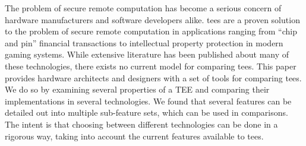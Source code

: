 The problem of secure remote computation has become a serious concern of hardware manufacturers and software developers alike. \glspl{tee} are a proven solution to the problem of secure remote computation in applications ranging from ``chip and pin'' financial transactions to intellectual property protection in modern gaming systems. While extensive literature has been published about many of these technologies, there exists no current model for comparing \glspl{tee}. This paper provides hardware architects and designers with a set of tools for comparing \glspl{tee}. We do so by examining several properties of a TEE and comparing their implementations in several technologies. We found that several features can be detailed out into multiple sub-feature sets, which can be used in comparisons. The intent is that choosing between different technologies can be done in a rigorous way, taking into account the current features available to \glspl{tee}.